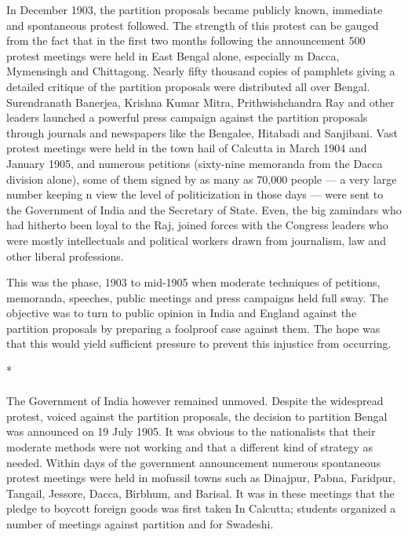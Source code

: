 In December 1903, the partition proposals became publicly known, immediate and spontaneous protest followed. The strength of this protest can be gauged from the fact that in the first two months following the announcement 500 protest meetings were held in East Bengal alone, especially m Dacca, Mymensingh and Chittagong. Nearly fifty thousand copies of pamphlets giving a detailed critique of the partition proposals were distributed all over Bengal. Surendranath Banerjea, Krishna Kumar Mitra, Prithwishchandra Ray and other leaders launched a powerful press campaign against the partition proposals through journals and newspapers like the Bengalee, Hitabadi and Sanjibani. Vast protest meetings were held in the town hail of Calcutta in March 1904 and January 1905, and numerous petitions (sixty-nine memoranda from the Dacca division alone), some of them signed by as many as 70,000 people --- a very large number keeping n view the level of politicization in those days --- were sent to the Government of India and the Secretary of State. Even, the big zamindars who had hitherto been loyal to the Raj, joined forces with the Congress leaders who were mostly intellectuals and political workers drawn from journalism, law and other liberal professions.

This was the phase, 1903 to mid-1905 when moderate techniques of petitions, memoranda, speeches, public meetings and press campaigns held full sway. The objective was to turn to public opinion in India and England against the partition proposals by preparing a foolproof case against them. The hope was that this would yield sufficient pressure to prevent this injustice from occurring.

\begin{center}*\end{center}

\paragraph*{}

The Government of India however remained unmoved. Despite the widespread protest, voiced against the partition proposals, the decision to partition Bengal was announced on 19 July 1905. It was obvious to the nationalists that their moderate methods were not working and that a different kind of strategy as needed. Within days of the government announcement numerous spontaneous protest meetings were held in mofussil towns such as Dinajpur, Pabna, Faridpur, Tangail, Jessore, Dacca, Birbhum, and Barisal. It was in these meetings that the pledge to boycott foreign goods was first taken In Calcutta; students organized a number of meetings against partition and for Swadeshi.

